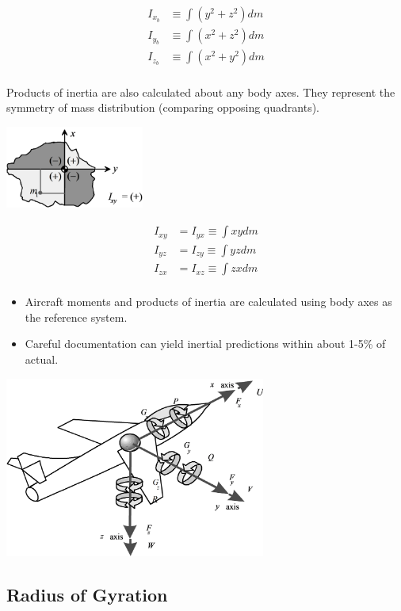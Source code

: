 \documentclass[
]{book}
\providecommand{\tightlist}{%
  \setlength{\itemsep}{0pt}\setlength{\parskip}{0pt}}
\begin{document}
\begin{align}
I_{x_b} &\equiv \int \left( y^2 + z^2 \right) dm \\
I_{y_b} &\equiv \int \left( x^2 + z^2 \right) dm \\
I_{z_b} &\equiv \int \left( x^2 + y^2 \right) dm \\
\end{align}

Products of inertia are also calculated about any body axes. They represent the symmetry of mass distribution (comparing opposing quadrants).

\includegraphics[width=1.79236in,height=1.07083in]{media/07/image16.svg}

\begin{align}
I_{xy} &= I_{yx} \equiv \int xy dm \\
I_{yz} &= I_{zy} \equiv \int yz dm \\
I_{zx} &= I_{xz} \equiv \int zx dm \\
\end{align}

\begin{itemize}
\tightlist
\item
  Aircraft moments and products of inertia are calculated using body axes as the reference system.
\item
  Careful documentation can yield inertial predictions within about 1-5\% of actual.
\end{itemize}

\includegraphics[width=3.37222in,height=2.33681in]{media/07/image17.svg}

\hypertarget{radius-of-gyration}{%
\subsection{Radius of Gyration}\label{radius-of-gyration}}
\end{document}
